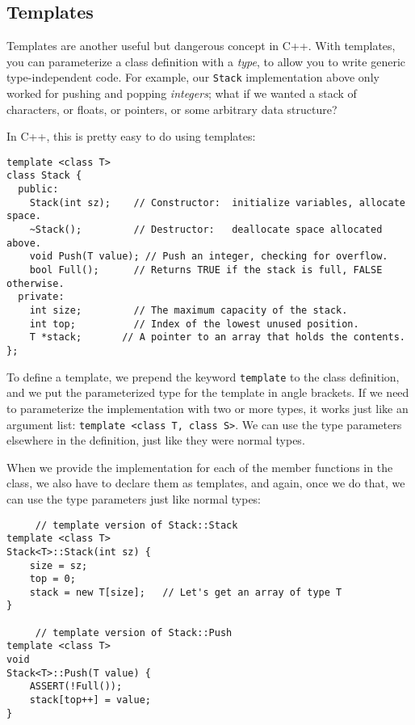 \subsection{Templates}

Templates are another useful but dangerous concept in C++.
With templates, you can parameterize a class definition
with a {\em type}, to allow you to write generic type-independent
code.  For example, our {\tt Stack} implementation above only worked
for pushing and popping {\em integers}; what if we wanted a stack
of characters, or floats, or pointers, or some arbitrary data structure?

In C++, this is pretty easy to do using templates:

\begin{verbatim}
template <class T>
class Stack {
  public:
    Stack(int sz);    // Constructor:  initialize variables, allocate space.
    ~Stack();         // Destructor:   deallocate space allocated above.
    void Push(T value); // Push an integer, checking for overflow.
    bool Full();      // Returns TRUE if the stack is full, FALSE otherwise.
  private:
    int size;         // The maximum capacity of the stack.
    int top;          // Index of the lowest unused position.
    T *stack;       // A pointer to an array that holds the contents.
};
\end{verbatim}

To define a template, we prepend the keyword {\tt template} to
the class definition, and we put the parameterized type for the
template in angle brackets.  If we need to parameterize the implementation
with two or more types, it works just like an argument list:
{\tt template <class T, class S>}.  We can use the type parameters
elsewhere in the definition, just like they were normal types.

When we provide the implementation for each of the member functions
in the class, we also have to declare them as templates, and again,
once we do that, we can use the type parameters just like normal types:

\begin{verbatim}
     // template version of Stack::Stack
template <class T>
Stack<T>::Stack(int sz) {
    size = sz;
    top = 0;
    stack = new T[size];   // Let's get an array of type T
}

     // template version of Stack::Push
template <class T>
void
Stack<T>::Push(T value) {
    ASSERT(!Full());
    stack[top++] = value;
}
\end{verbatim}


